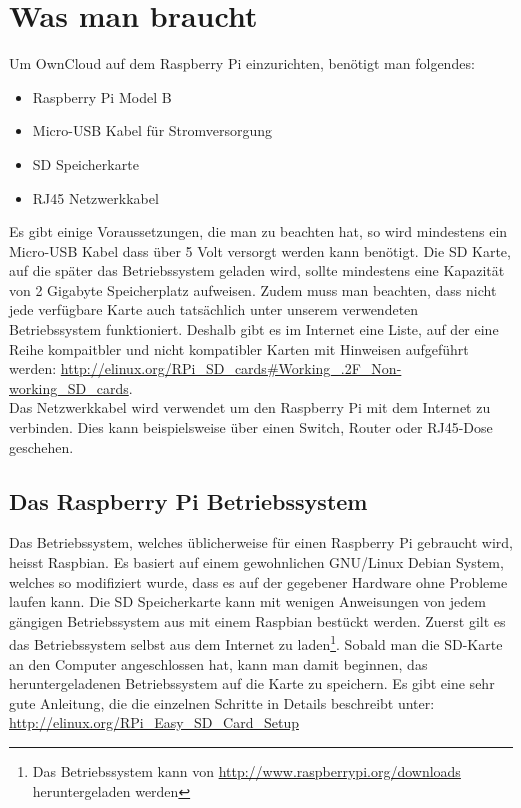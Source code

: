 \section{Was man braucht}
Um OwnCloud auf dem Raspberry Pi einzurichten, benötigt man folgendes:

\begin{itemize}
  \item Raspberry Pi Model B
  \item Micro-USB Kabel für Stromversorgung
  \item SD Speicherkarte
  \item RJ45 Netzwerkkabel
\end{itemize}

Es gibt einige Voraussetzungen, die man zu beachten hat, so wird mindestens ein Micro-USB Kabel dass über 5 Volt versorgt werden kann benötigt. Die SD Karte, auf die später das Betriebssystem geladen wird, sollte mindestens eine Kapazität von 2 Gigabyte Speicherplatz aufweisen. Zudem muss man beachten, dass nicht jede verfügbare Karte auch tatsächlich unter unserem verwendeten Betriebssystem funktioniert. Deshalb gibt es im Internet eine Liste, auf der eine Reihe kompaitbler und nicht kompatibler Karten mit Hinweisen aufgeführt werden: \url{http://elinux.org/RPi\_SD\_cards#Working\_.2F\_Non-working\_SD\_cards}. \\
Das Netzwerkkabel wird verwendet um den Raspberry Pi mit dem Internet zu verbinden. Dies kann beispielsweise über einen Switch, Router oder RJ45-Dose geschehen. \\

\subsection{Das Raspberry Pi Betriebssystem}
Das Betriebssystem, welches üblicherweise für einen Raspberry Pi gebraucht wird, heisst Raspbian. Es basiert auf einem gewohnlichen GNU/Linux Debian System, welches so modifiziert wurde, dass es auf der gegebener Hardware ohne Probleme laufen kann.
Die SD Speicherkarte kann mit wenigen Anweisungen von jedem gängigen Betriebssystem aus mit einem Raspbian bestückt werden.
Zuerst gilt es das Betriebssystem selbst aus dem Internet zu laden\footnote{Das Betriebssystem kann von \url{http://www.raspberrypi.org/downloads} heruntergeladen werden}. Sobald man die SD-Karte an den Computer angeschlossen hat, kann man damit beginnen, das heruntergeladenen Betriebssystem auf die Karte zu speichern.
Es gibt eine sehr gute Anleitung, die die einzelnen Schritte in Details beschreibt unter: \url{http://elinux.org/RPi\_Easy\_SD\_Card\_Setup}
